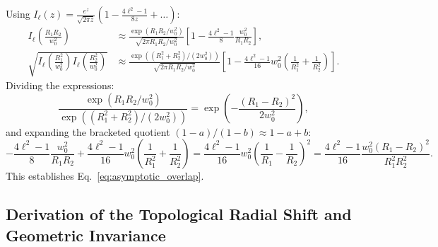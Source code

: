 \documentclass{optica-article}
\begin{document}
Using $I_\ell(z) = \frac{e^z}{\sqrt{2\pi z}} (1 - \frac{4\ell^2 - 1}{8z} + \dots)$:
\begin{align}
I_\ell\left( \frac{R_1 R_2}{w_0^2} \right) &\approx \frac{\exp(R_1 R_2 / w_0^2)}{\sqrt{2\pi R_1 R_2 / w_0^2}} \left[ 1 - \frac{4\ell^2 - 1}{8} \frac{w_0^2}{R_1 R_2} \right], \\
\sqrt{I_\ell\left( \frac{R_1^2}{w_0^2} \right) I_\ell\left( \frac{R_2^2}{w_0^2} \right)} &\approx \frac{\exp((R_1^2 + R_2^2) / (2 w_0^2))}{\sqrt{2\pi R_1 R_2 / w_0^2}} \left[ 1 - \frac{4\ell^2 - 1}{16} w_0^2 \left( \frac{1}{R_1^2} + \frac{1}{R_2^2} \right) \right].
\end{align}
Dividing the expressions:
\begin{equation}
\frac{\exp(R_1 R_2 / w_0^2)}{\exp((R_1^2 + R_2^2) / (2 w_0^2))} = \exp\left( - \frac{(R_1 - R_2)^2}{2 w_0^2} \right),
\end{equation}
and expanding the bracketed quotient $(1 - a)/(1 - b) \approx 1 - a + b$:
\begin{equation}
- \frac{4\ell^2 - 1}{8} \frac{w_0^2}{R_1 R_2} + \frac{4\ell^2 - 1}{16} w_0^2 \left( \frac{1}{R_1^2} + \frac{1}{R_2^2} \right) = \frac{4\ell^2 - 1}{16} w_0^2 \left( \frac{1}{R_1} - \frac{1}{R_2} \right)^2 = \frac{4\ell^2 - 1}{16} \frac{w_0^2 (R_1 - R_2)^2}{R_1^2 R_2^2}.
\end{equation}
This establishes Eq.~\eqref{eq:asymptotic_overlap}.

\subsection{Derivation of the Topological Radial Shift and Geometric Invariance}
\end{document}
